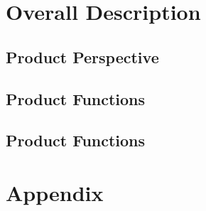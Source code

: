 \documentclass[a4paper,12pt]{report}
\begin{document}
\chapter{Overall Description}
\label{ch:Overall Description}

\section{Product Perspective}


\section{Product Functions}


\section{Product Functions}


\appendix
\chapter{Appendix}



\end{document}
